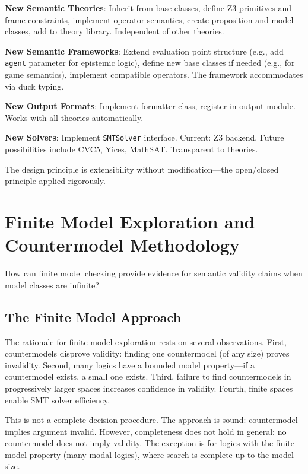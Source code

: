 \documentclass[pdflatex,sn-mathphys-num]{sn-jnl}
\theoremstyle{thmstyleone}
\theoremstyle{thmstyletwo}
\theoremstyle{thmstylethree}
\begin{document}
\textbf{New Semantic Theories}: Inherit from base classes, define Z3 primitives and frame constraints, implement operator semantics, create proposition and model classes, add to theory library.
Independent of other theories.

\textbf{New Semantic Frameworks}: Extend evaluation point structure (e.g., add \texttt{agent} parameter for epistemic logic), define new base classes if needed (e.g., for game semantics), implement compatible operators.
The framework accommodates via duck typing.

\textbf{New Output Formats}: Implement formatter class, register in output module.
Works with all theories automatically.

\textbf{New Solvers}: Implement \texttt{SMTSolver} interface.
Current: Z3 backend.
Future possibilities include CVC5, Yices, MathSAT.
Transparent to theories.

The design principle is extensibility without modification---the open/closed principle applied rigorously.


\section{Finite Model Exploration and Countermodel Methodology}\label{sec:finite-model}

How can finite model checking provide evidence for semantic validity claims when model classes are infinite?

\subsection{The Finite Model Approach}\label{sec:finite-approach}

The rationale for finite model exploration rests on several observations.
First, countermodels disprove validity: finding one countermodel (of any size) proves invalidity.
Second, many logics have a bounded model property---if a countermodel exists, a small one exists.
Third, failure to find countermodels in progressively larger spaces increases confidence in validity.
Fourth, finite spaces enable SMT solver efficiency.

This is not a complete decision procedure.
The approach is sound: countermodel implies argument invalid.
However, completeness does not hold in general: no countermodel does not imply validity.
The exception is for logics with the finite model property (many modal logics), where search is complete up to the model size.
\end{document}
